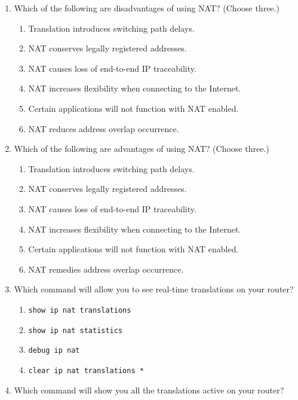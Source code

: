 \begin{enumerate}
\item
  Which of the following are disadvantages of using NAT? (Choose three.)

  \begin{enumerate}
    \item
    Translation introduces switching path delays.
  \item
    NAT conserves legally registered addresses.
  \item
    NAT causes loss of end-to-end IP traceability.
  \item
    NAT increases flexibility when connecting to the Internet.
  \item
    Certain applications will not function with NAT enabled.
  \item
    NAT reduces address overlap occurrence.
  \end{enumerate}
\item
  Which of the following are advantages of using NAT? (Choose three.)

  \begin{enumerate}
    \item
    Translation introduces switching path delays.
  \item
    NAT conserves legally registered addresses.
  \item
    NAT causes loss of end-to-end IP traceability.
  \item
    NAT increases flexibility when connecting to the Internet.
  \item
    Certain applications will not function with NAT enabled.
  \item
    NAT remedies address overlap occurrence.
  \end{enumerate}
\item
  Which command will allow you to see real-time translations on your
  router?

  \begin{enumerate}
    \item
    \texttt{show\ ip\ nat\ translations}
  \item
    \texttt{show\ ip\ nat\ statistics}
  \item
    \texttt{debug\ ip\ nat}
  \item
    \texttt{clear\ ip\ nat\ translations\ *}
  \end{enumerate}
\item
  Which command will show you all the translations active on your
  router?


\end{enumerate}
